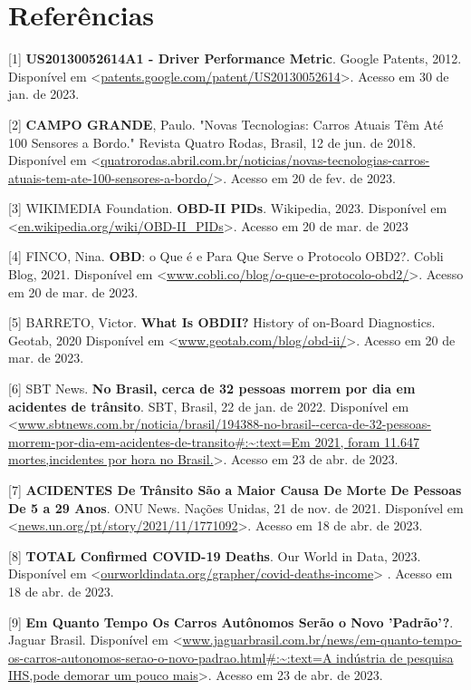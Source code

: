 \chapter{Referências}


[1] \textbf{US20130052614A1 - Driver Performance Metric}. Google Patents, 2012. Disponível em <\url{patents.google.com/patent/US20130052614}>. Acesso em 30 de jan. de 2023.

[2] \textbf{CAMPO GRANDE}, Paulo. "Novas Tecnologias: Carros Atuais Têm Até 100 Sensores a Bordo." Revista Quatro Rodas, Brasil, 12 de jun. de 2018. Disponível em <\url{quatrorodas.abril.com.br/noticias/novas-tecnologias-carros-atuais-tem-ate-100-sensores-a-bordo/}>. Acesso em 20 de fev. de 2023.

[3] WIKIMEDIA Foundation. \textbf{OBD-II PIDs}. Wikipedia, 2023. Disponível em <\url{en.wikipedia.org/wiki/OBD-II_PIDs}>. Acesso em 20 de mar. de 2023

[4] FINCO, Nina. \textbf{OBD}: o Que é e Para Que Serve o Protocolo OBD2?. Cobli Blog, 2021. Disponível em <\url{www.cobli.co/blog/o-que-e-protocolo-obd2/}>. Acesso em 20 de mar. de 2023.

[5] BARRETO, Victor. \textbf{What Is OBDII?} History of on-Board Diagnostics. Geotab, 2020 Disponível em <\url{www.geotab.com/blog/obd-ii/}>. Acesso em 20 de mar. de 2023.

[6] SBT News. \textbf{No Brasil, cerca de 32 pessoas morrem por dia em acidentes de trânsito}. SBT, Brasil, 22 de jan. de 2022. Disponível em <\url{www.sbtnews.com.br/noticia/brasil/194388-no-brasil--cerca-de-32-pessoas-morrem-por-dia-em-acidentes-de-transito#:~:text=Em 2021, foram 11.647 mortes,incidentes por hora no Brasil.}>. Acesso em 23 de abr. de 2023.

[7] \textbf{ACIDENTES De Trânsito São a Maior Causa De Morte De Pessoas De 5 a 29 Anos}. ONU News. Nações Unidas, 21 de nov. de 2021. Disponível em <\url{news.un.org/pt/story/2021/11/1771092}>. Acesso em 18 de abr. de 2023.

[8] \textbf{TOTAL Confirmed COVID-19 Deaths}. Our World in Data, 2023. Disponível em <\url{ourworldindata.org/grapher/covid-deaths-income}>
. Acesso em 18 de abr. de 2023.

[9] \textbf{Em Quanto Tempo Os Carros Autônomos Serão o Novo 'Padrão'?}. Jaguar Brasil. Disponível em <\url{www.jaguarbrasil.com.br/news/em-quanto-tempo-os-carros-autonomos-serao-o-novo-padrao.html#:~:text=A indústria de pesquisa IHS,pode demorar um pouco mais}>. Acesso em 23 de abr. de 2023.


